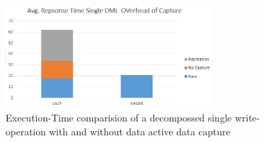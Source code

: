 \begin{figure}[t] 
    \centering 
    \includegraphics[width=0.7\textwidth]{Figures/dml_comp.PNG}
    \caption{Execution-Time comparision of a decompossed  single write-operation with and without data active data capture }
    \label{fig:write_decomposition}
\end{figure}



